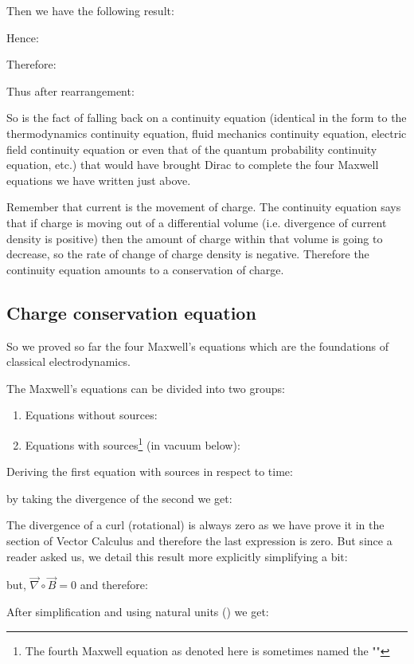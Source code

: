 	Then we have the following result:
	
	Hence:
	
	Therefore:
	
	Thus after rearrangement:
	
	So is the fact of falling back on a continuity equation (identical in the form to the thermodynamics continuity equation, fluid mechanics continuity equation, electric field continuity equation or even that of the quantum probability continuity equation, etc.) that would have brought Dirac to complete the four Maxwell equations we have written just above.
	
	Remember that current is the movement of charge. The continuity equation says that if charge is moving out of a differential volume (i.e. divergence of current density is positive) then the amount of charge within that volume is going to decrease, so the rate of change of charge density is negative. Therefore the continuity equation amounts to a conservation of charge.
	
	\subsection{Charge conservation equation}\label{charge conservation equation}
	So we proved so far the four Maxwell's equations which are the foundations of classical electrodynamics.

	The Maxwell's equations can be divided into two groups:
	\begin{enumerate}
		\item Equations without sources:
		

		\item Equations with sources\footnote{The fourth Maxwell equation as denoted here is sometimes named the ""} (in vacuum below):
		
	\end{enumerate}
	Deriving the first equation with sources in respect to time:
	
	by taking the divergence of the second we get:
	
	The divergence of a curl (rotational) is always zero as we have prove it in the section of Vector Calculus and therefore the last expression is zero. But since a reader asked us, we detail this result more explicitly simplifying a bit:
	
	but, $\vec{\nabla}\circ\vec{B}=0$ and therefore:
	
	After simplification and using natural units () we get:
	
